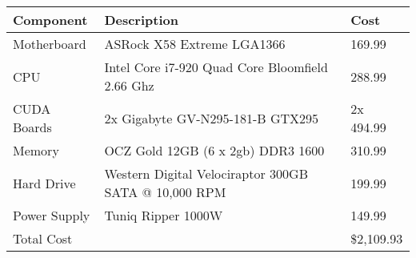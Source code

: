 \documentclass[10pt]{article}
\begin{document}
\begin{table}[h]
	\centering
		\begin{tabular}{|l|l|l|}
		\hline
			Component & Description & Cost\\ \hline
			Motherboard & ASRock X58 Extreme LGA1366 & 169.99\\ \hline
			CPU & Intel Core i7-920 Quad Core Bloomfield 2.66 Ghz & 288.99\\ \hline
			CUDA Boards & 2x Gigabyte GV-N295-181-B  GTX295 & 2x 494.99\\ \hline
			Memory & OCZ Gold 12GB (6 x 2gb) DDR3 1600 & 310.99\\ \hline
			Hard Drive & Western Digital Velociraptor 300GB SATA @ 10,000 RPM & 199.99\\ \hline
			Power Supply & Tuniq Ripper 1000W & 149.99\\ \hline
			Total Cost &  & \$2,109.93\\ 
		\hline
		\end{tabular}
\end{table}
\end{document}
